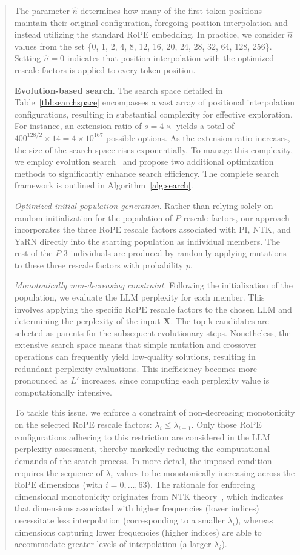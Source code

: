 \begin{abstract}
The parameter $\hat{n}$ determines how many of the first token positions maintain their original configuration, foregoing position interpolation and instead utilizing the standard RoPE embedding. In practice, we consider $\hat{n}$ values from the set \{0, 1, 2, 4, 8, 12, 16, 20, 24, 28, 32, 64, 128, 256\}. Setting $\hat{n}=0$ indicates that position interpolation with the optimized rescale factors is applied to every token position.

\textbf{Evolution-based search}. The search space detailed in Table~\ref{tbl:searchspace} encompasses a vast array of positional interpolation configurations, resulting in substantial complexity for effective exploration. For instance, an extension ratio of $s=4\times$ yields a total of $400^{128/2}\times14=4\times10^{167}$ possible options. As the extension ratio increases, the size of the search space rises exponentially. To manage this complexity, we employ evolution search~\cite{guo2020single} and propose two additional optimization methods to significantly enhance search efficiency. The complete search framework is outlined in Algorithm~\ref{alg:search}.

\textit{Optimized initial population generation}. Rather than relying solely on random initialization for the population of $P$ rescale factors, our approach incorporates the three RoPE rescale factors associated with PI, NTK, and YaRN directly into the starting population as individual members. The rest of the $P$-3 individuals are produced by randomly applying mutations to these three rescale factors with probability $p$.

\textit{Monotonically non-decreasing constraint}. Following the initialization of the population, we evaluate the LLM perplexity for each member. This involves applying the specific RoPE rescale factors to the chosen LLM and determining the perplexity of the input $\mathbf{X}$. The top-k candidates are selected as parents for the subsequent evolutionary steps. Nonetheless, the extensive search space means that simple mutation and crossover operations can frequently yield low-quality solutions, resulting in redundant perplexity evaluations. This inefficiency becomes more pronounced as $L'$ increases, since computing each perplexity value is computationally intensive.

To tackle this issue, we enforce a constraint of non-decreasing monotonicity on the selected RoPE rescale factors: $\lambda_i \le \lambda_{i+1}$. Only those RoPE configurations adhering to this restriction are considered in the LLM perplexity assessment, thereby markedly reducing the computational demands of the search process. In more detail, the imposed condition requires the sequence of $\lambda_i$ values to be monotonically increasing across the RoPE dimensions (with $i=0,\ldots, 63$). The rationale for enforcing dimensional monotonicity originates from NTK theory~\cite{jacot2018neural,tancik2020fourier,ntk}, which indicates that dimensions associated with higher frequencies (lower indices) necessitate less interpolation (corresponding to a smaller $\lambda_i$), whereas dimensions capturing lower frequencies (higher indices) are able to accommodate greater levels of interpolation (a larger $\lambda_i$).


\end{abstract}
